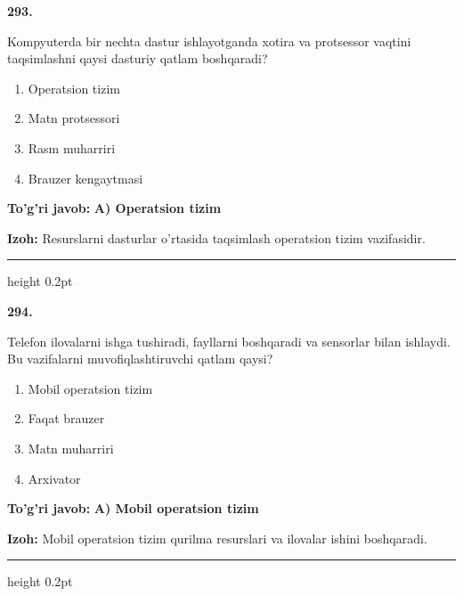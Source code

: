 \documentclass[10pt,a4paper]{article}
\begin{document}
{\bfseries\sffamily\color{ink} 293.}
\par
Kompyuterda bir nechta dastur ishlayotganda xotira va protsessor vaqtini taqsimlashni qaysi dasturiy qatlam boshqaradi?
\begin{enumerate}[label=\Alph*),leftmargin=9mm]
\item Operatsion tizim
\item Matn protsessori
\item Rasm muharriri
\item Brauzer kengaytmasi
\end{enumerate}
\begin{tcolorbox}[enhanced,breakable,colback=teal!4,colframe=teal!60!black,boxrule=0.45pt,arc=1.2mm,left=2.7mm,right=2.7mm,top=1.8mm,bottom=1.8mm,before skip=2mm,after skip=2mm]
{\bfseries\sffamily\color{teal}To'g'ri javob:} \textbf{A) Operatsion tizim}
\par\smallskip
{\bfseries Izoh:} Resurslarni dasturlar o'rtasida taqsimlash operatsion tizim vazifasidir.
\end{tcolorbox}
\vspace{2mm}\hrule height 0.2pt\vspace{3mm}

{\bfseries\sffamily\color{ink} 294.}
\par
Telefon ilovalarni ishga tushiradi, fayllarni boshqaradi va sensorlar bilan ishlaydi. Bu vazifalarni muvofiqlashtiruvchi qatlam qaysi?
\begin{enumerate}[label=\Alph*),leftmargin=9mm]
\item Mobil operatsion tizim
\item Faqat brauzer
\item Matn muharriri
\item Arxivator
\end{enumerate}
\begin{tcolorbox}[enhanced,breakable,colback=teal!4,colframe=teal!60!black,boxrule=0.45pt,arc=1.2mm,left=2.7mm,right=2.7mm,top=1.8mm,bottom=1.8mm,before skip=2mm,after skip=2mm]
{\bfseries\sffamily\color{teal}To'g'ri javob:} \textbf{A) Mobil operatsion tizim}
\par\smallskip
{\bfseries Izoh:} Mobil operatsion tizim qurilma resurslari va ilovalar ishini boshqaradi.
\end{tcolorbox}
\vspace{2mm}\hrule height 0.2pt\vspace{3mm}
\end{document}
